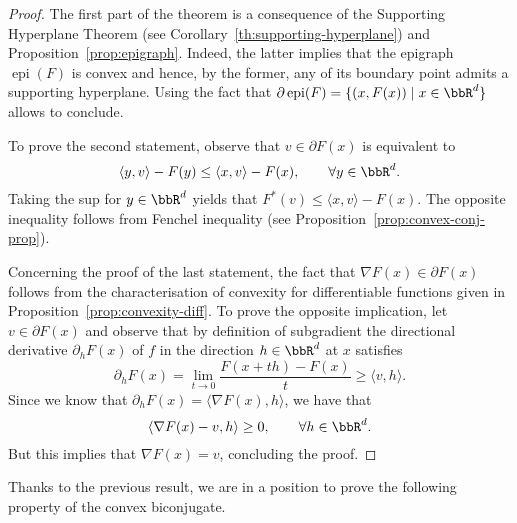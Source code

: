  \begin{proof}
     The first part of the theorem is a consequence of the Supporting Hyperplane Theorem (see Corollary~\ref{th:supporting-hyperplane}) and Proposition~\ref{prop:epigraph}. Indeed, the latter implies that the epigraph $\operatorname{epi}(F)$ is convex and hence, by the former, any of its boundary point admits a supporting hyperplane. Using the fact that $\partial\operatorname{epi}(F)=\{(x,F(x))\mid x\in\bbR^d\}$ allows to conclude.
 
     To prove the second statement, observe that $v\in\partial F(x)$ is equivalent to
     \begin{equation}
         \langle y,v\rangle - F(y) \le \langle x,v\rangle-F(x), \qquad \forall y\in\bbR^d.
     \end{equation}
     Taking the sup for $y\in\bbR^d$ yields that $F^*(v)\le \langle x,v\rangle -F(x)$. The opposite inequality follows from Fenchel inequality (see Proposition~\ref{prop:convex-conj-prop}).
 
     Concerning the proof of the last statement, the fact that $\nabla F(x)\in \partial F(x)$ follows from the characterisation of convexity for differentiable functions given in Proposition~\ref{prop:convexity-diff}.
     To prove the opposite implication, let $v\in \partial F(x)$ and observe that by definition of subgradient the directional derivative $\partial_h F(x)$ of $f$ in the direction $h\in\bbR^d$ at $x$ satisfies
     \begin{equation}
         \partial_h F(x) = \lim_{t\to 0} \frac{F(x+th)-F(x)}{t} \ge \langle v, h\rangle.
     \end{equation}
     Since we know that $\partial_hF (x)=\langle \nabla F(x),h\rangle$, we have that
     \begin{equation}
         \langle \nabla F(x) - v,h\rangle \ge 0, \qquad \forall h\in\bbR^d.
     \end{equation}
     But this implies that $\nabla F(x)=v$, concluding the proof.
 \end{proof}
 
 
 
 Thanks to the previous result, we are in a position to prove the following property of the convex biconjugate.
 
 
